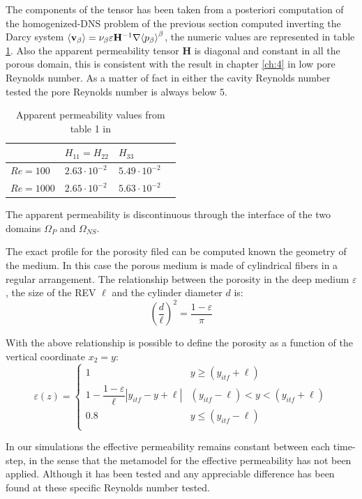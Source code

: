 The components of the tensor has been taken from a posteriori computation of the homogenized-DNS problem of the previous section computed inverting the Darcy system ${\left< \textbf{v}_{\beta} \right>} = \nu_{\beta} \varepsilon \mathbf{H}^{-1} \nabla {\left< p_{\beta}\right>}^{\beta}$, the numeric values are represented in table \ref{tab:H}.
Also the apparent permeability tensor $\mathbf{H}$ is diagonal and constant in all the porous domain, this is consistent with the result in chapter \ref{ch:4} in low pore Reynolds number. As a matter of fact in either the cavity Reynolds number tested the pore Reynolds number is always below $5$.

\begin{table}[h]
	\centering
	\begin{tabular}{ l | l |  l   l   }
		& $H_{11} = H_{22}$ & $H_{33}$ \\ 
		\hline
		\hline
		$Re=100$ & $2.63 \cdot 10^{-2}$ & $5.49 \cdot 10^{-2}$ \\ 
		$Re=1000$ & $2.65 \cdot 10^{-2}$ & $5.63 \cdot 10^{-2}$
	\end{tabular}
	\caption{Apparent permeability values from table 1 in \citet{zampogna2016fluid}}
	\label{tab:H}
\end{table}

The apparent permeability is discontinuous through the interface of the two domains $\Omega_P$ and $\Omega_{NS}$.

The exact profile for the porosity filed can be computed known the geometry of the medium. In this case the porous medium is made of cylindrical fibers in a regular  arrangement. The relationship between the porosity in the deep medium $\varepsilon$, the size of the REV $\ell$ and the cylinder diameter $d$ is:
$$
\left( \dfrac{d}{\ell} \right)^2 = \dfrac{1 - \varepsilon}{\pi}
$$

With the above relationship is possible to define the porosity as a function of the vertical coordinate $x_2 = y$:
\begin{equation}
\varepsilon(z) = 
\begin{cases}
1 & y\geqslant(y_{itf}+\ell) \\
1 - \dfrac{1-\varepsilon}{\ell}|y_{itf} -y +\ell| &  (y_{itf}-\ell)<y<(y_{itf}+\ell)\\
0.8 &y\leqslant(y_{itf}-\ell) \\
\end{cases}
\label{eq:porsitity_fun}
\end{equation}

In our simulations the effective permeability remains constant between each time-step, in the sense that the metamodel for the effective permeability has not been applied. Although it has been tested and any appreciable difference has been found at these specific Reynolds number tested.

